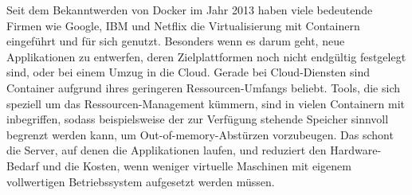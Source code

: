 Seit dem Bekanntwerden von Docker im Jahr 2013 haben viele bedeutende Firmen wie Google, IBM und Netflix die Virtualisierung mit Containern eingeführt und für sich genutzt. 
Besonders wenn es darum geht, neue Applikationen zu entwerfen, deren Zielplattformen noch nicht endgültig festgelegt sind, oder bei einem Umzug in die Cloud. Gerade bei Cloud-Diensten sind Container aufgrund ihres geringeren Ressourcen-Umfangs beliebt. Tools, die sich speziell um das Ressourcen-Management kümmern, sind in vielen Containern mit inbegriffen, sodass beispielsweise der zur Verfügung stehende Speicher sinnvoll begrenzt werden kann, um Out-of-memory-Abstürzen vorzubeugen. 
Das schont die Server, auf denen die Applikationen laufen, und reduziert den Hardware-Bedarf und die Kosten, wenn weniger virtuelle Maschinen mit eigenem vollwertigen Betriebssystem aufgesetzt werden müssen.